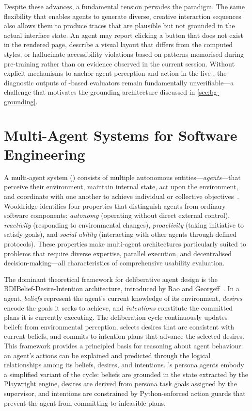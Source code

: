 Despite these advances, a fundamental tension pervades the paradigm. The same flexibility that enables  agents to generate diverse, creative interaction sequences also allows them to produce traces that are plausible but not grounded in the actual interface state. An agent may report clicking a button that does not exist in the rendered page, describe a visual layout that differs from the computed styles, or hallucinate accessibility violations based on patterns memorised during pre-training rather than on evidence observed in the current session. Without explicit mechanisms to anchor agent perception and action in the live , the diagnostic outputs of -based evaluators remain fundamentally unverifiable---a challenge that motivates the grounding architecture discussed in \cref{sec:bg-grounding}.


\section{Multi-Agent Systems for Software Engineering}
\label{sec:bg-mas}

A multi-agent system () consists of multiple autonomous entities---\textit{agents}---that perceive their environment, maintain internal state, act upon the environment, and coordinate with one another to achieve individual or collective objectives~\cite{wooldridge2009mas}. Wooldridge identifies four properties that distinguish agents from ordinary software components: \textit{autonomy} (operating without direct external control), \textit{reactivity} (responding to environmental changes), \textit{proactivity} (taking initiative to satisfy goals), and \textit{social ability} (interacting with other agents through defined protocols). These properties make multi-agent architectures particularly suited to problems that require diverse expertise, parallel execution, and decentralised decision-making---all characteristics of comprehensive usability evaluation.

The dominant theoretical framework for deliberative agent design is the \acrfull{BDI}{Belief-Desire-Intention} architecture, introduced by Rao and Georgeff~\cite{rao1995bdi}. In a  agent, \textit{beliefs} represent the agent's current knowledge of its environment, \textit{desires} encode the goals it seeks to achieve, and \textit{intentions} constitute the committed plans it is currently executing. The deliberation cycle continuously updates beliefs from environmental perception, selects desires that are consistent with current beliefs, and commits to intention plans that advance the selected desires. This framework provides a principled basis for reasoning about agent behaviour: an agent's actions can be explained and predicted through the logical relationships among its beliefs, desires, and intentions. \versimux{}'s persona agents embody a simplified variant of the  cycle: beliefs are grounded in the  state extracted by the Playwright engine, desires are derived from persona task goals assigned by the supervisor, and intentions are constrained by Python-enforced action guards that prevent the agent from committing to infeasible plans.

